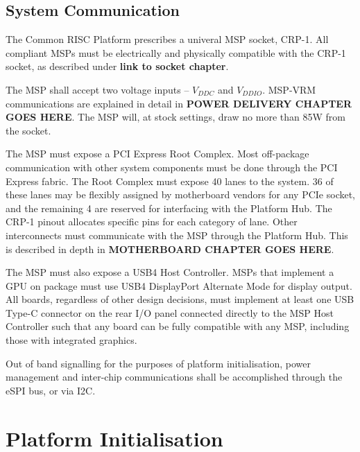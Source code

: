 \documentclass[12pt]{report}
\begin{document}
\section{System Communication}
The Common RISC Platform prescribes a univeral MSP socket, CRP-1. All compliant MSPs must be electrically and physically
compatible with the CRP-1 socket, as described under \textbf{link to socket chapter}.

The MSP shall accept two voltage inputs -- $V_{DDC}$ and $V_{DDIO}$. MSP-VRM communications are explained in detail
in \textbf{POWER DELIVERY CHAPTER GOES HERE}. The MSP will, at stock settings, draw no more than 85W from the socket.

The MSP must expose a PCI Express Root Complex. Most off-package communication with other system components must be done
through the PCI Express fabric. The Root Complex must expose 40 lanes to the system. 36 of these lanes may be flexibly
assigned by motherboard vendors for any PCIe socket, and the remaining 4 are reserved for interfacing with
the Platform Hub. The CRP-1 pinout allocates specific pins for each category of lane. Other interconnects must communicate
with the MSP through the Platform Hub. This is described in depth in \textbf{MOTHERBOARD CHAPTER GOES HERE}.

The MSP must also expose a USB4 Host Controller. MSPs that implement a GPU on package must use USB4 DisplayPort Alternate
Mode for display output. All boards, regardless of other design decisions, must implement at least one USB Type-C connector
on the rear I/O panel connected directly to the MSP Host Controller such that any board can be fully compatible with
any MSP, including those with integrated graphics.

Out of band signalling for the purposes of platform initialisation, power management and inter-chip communications shall
be accomplished through the eSPI bus, or via I2C.


\chapter{Platform Initialisation}
\newpage
\end{document}

